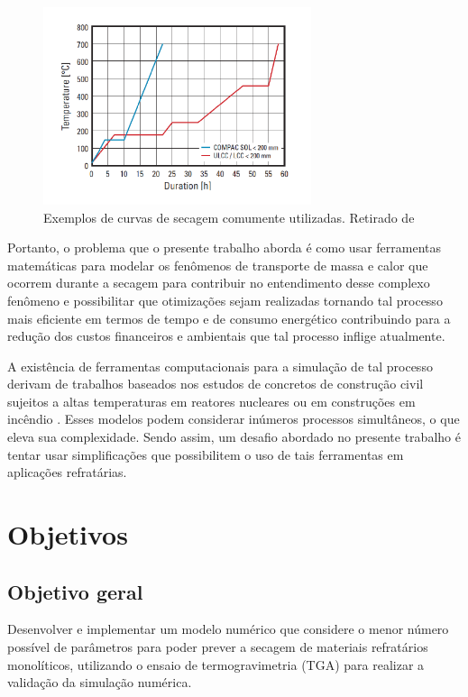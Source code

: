     \begin{figure}[!ht]
        \centering
        \includegraphics[width=0.7\textwidth]{figures/hucs.pdf}
        \caption{Exemplos de curvas de secagem comumente utilizadas. Retirado de \cite{rhi}}
        \label{fig:hucs}
   \end{figure}

   Portanto, o problema que o presente trabalho aborda é como usar ferramentas
   matemáticas para modelar os fenômenos de transporte de massa e calor que
   ocorrem durante a secagem para contribuir no entendimento desse complexo
   fenômeno e possibilitar que otimizações sejam realizadas tornando tal
   processo mais eficiente em termos de tempo e de consumo energético
   contribuindo para a redução dos custos financeiros e ambientais que tal
   processo inflige atualmente.
 
   A existência de ferramentas computacionais para a simulação de tal processo
   derivam de trabalhos baseados nos estudos de concretos de construção civil
   sujeitos a altas temperaturas em reatores nucleares ou em construções em
   incêndio \cite{bazant1978thermal, Abdel-Rahman1996, Gawin2004}. Esses modelos
   podem considerar inúmeros processos simultâneos, o que eleva sua
   complexidade. Sendo assim, um desafio abordado no presente trabalho é tentar
   usar simplificações que possibilitem o uso de tais ferramentas em aplicações
   refratárias.
   
\section{Objetivos}
    \subsection{Objetivo geral}
        
    Desenvolver e implementar um modelo numérico que considere o menor número
    possível de parâmetros para poder prever a secagem de materiais refratários
    monolíticos, utilizando o ensaio de termogravimetria (TGA) para realizar a
    validação da simulação numérica.
        
